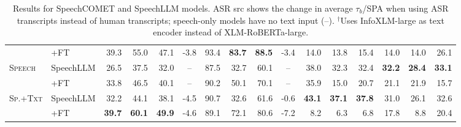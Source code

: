 \begin{table}[t]
\begin{tabular}{ll|rrrc|rrrc|rrr|rrr}
 & \quad+FT & \cellcolor[RGB]{184,224,224}39.3 & \cellcolor[RGB]{192,228,227}55.0 & \cellcolor[RGB]{189,227,226}47.1 & \cellcolor[RGB]{230,239,247}\scriptsize{-3.8} & \cellcolor[RGB]{186,225,225}93.4 & \cellcolor[RGB]{190,227,226}\textbf{83.7} & \cellcolor[RGB]{183,224,223}\textbf{88.5} & \cellcolor[RGB]{227,237,246}\scriptsize{-3.4} & \cellcolor[RGB]{255,255,255}14.0 & \cellcolor[RGB]{255,255,255}13.8 & \cellcolor[RGB]{255,255,255}15.4 & \cellcolor[RGB]{255,255,255}14.0 & \cellcolor[RGB]{255,255,255}14.0 & \cellcolor[RGB]{255,255,255}26.1 \\
\multirow{2}{*}{\textsc{Speech}} & SpeechLLM & \cellcolor[RGB]{224,242,241}26.5 & \cellcolor[RGB]{222,241,240}37.5 & \cellcolor[RGB]{223,241,241}32.0 & -- & \cellcolor[RGB]{194,229,228}87.5 & \cellcolor[RGB]{254,254,254}32.7 & \cellcolor[RGB]{246,251,251}60.1 & -- & \cellcolor[RGB]{255,255,255}38.0 & \cellcolor[RGB]{255,255,255}32.3 & \cellcolor[RGB]{255,255,255}32.4 & \cellcolor[RGB]{255,255,255}\textbf{32.2} & \cellcolor[RGB]{255,255,255}\textbf{28.4} & \cellcolor[RGB]{255,255,255}\textbf{33.1} \\
 & \quad+FT & \cellcolor[RGB]{202,232,231}33.8 & \cellcolor[RGB]{207,234,234}46.5 & \cellcolor[RGB]{205,233,233}40.1 & -- & \cellcolor[RGB]{191,227,227}90.2 & \cellcolor[RGB]{232,245,245}50.1 & \cellcolor[RGB]{224,241,241}70.1 & -- & \cellcolor[RGB]{255,255,255}35.9 & \cellcolor[RGB]{255,255,255}15.0 & \cellcolor[RGB]{255,255,255}20.7 & \cellcolor[RGB]{255,255,255}21.1 & \cellcolor[RGB]{255,255,255}21.9 & \cellcolor[RGB]{255,255,255}15.7 \\
\multirow{2}{*}{\textsc{Sp.+Txt}} & SpeechLLM & \cellcolor[RGB]{207,234,234}32.2 & \cellcolor[RGB]{211,236,235}44.1 & \cellcolor[RGB]{209,235,235}38.1 & \cellcolor[RGB]{236,242,248}\scriptsize{-4.5} & \cellcolor[RGB]{190,227,226}90.7 & \cellcolor[RGB]{255,255,255}32.6 & \cellcolor[RGB]{242,249,249}61.6 & \cellcolor[RGB]{207,223,239}\scriptsize{-0.6} & \cellcolor[RGB]{255,255,255}\textbf{43.1} & \cellcolor[RGB]{255,255,255}\textbf{37.1} & \cellcolor[RGB]{255,255,255}\textbf{37.8} & \cellcolor[RGB]{255,255,255}31.0 & \cellcolor[RGB]{255,255,255}26.1 & \cellcolor[RGB]{255,255,255}32.6 \\
 & \quad+FT & \cellcolor[RGB]{183,224,223}\textbf{39.7} & \cellcolor[RGB]{183,224,223}\textbf{60.1} & \cellcolor[RGB]{183,224,223}\textbf{49.9} & \cellcolor[RGB]{236,243,249}\scriptsize{-4.6} & \cellcolor[RGB]{192,228,227}89.1 & \cellcolor[RGB]{205,233,233}72.1 & \cellcolor[RGB]{201,231,231}80.6 & \cellcolor[RGB]{255,255,255}\scriptsize{-7.2} & \cellcolor[RGB]{255,255,255}8.2 & \cellcolor[RGB]{255,255,255}6.3 & \cellcolor[RGB]{255,255,255}6.8 & \cellcolor[RGB]{255,255,255}17.8 & \cellcolor[RGB]{255,255,255}8.8 & \cellcolor[RGB]{255,255,255}20.4 \\
\bottomrule
\end{tabular}
\caption{Results for SpeechCOMET and SpeechLLM models. ASR src shows the change in average $\tau_b$/SPA when using ASR transcripts instead of human transcripts; speech-only models have no text input (--). $^\dagger$Uses InfoXLM-large as text encoder instead of XLM-RoBERTa-large.}\label{tab:main_results_v2}
\end{table}
